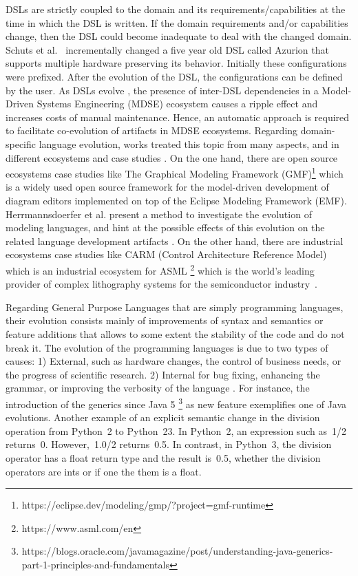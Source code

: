   
  DSLs are strictly coupled to the domain and
  its requirements/capabilities at the time in which the DSL is written. If the domain requirements and/or capabilities change, then the DSL could become inadequate to deal with the changed domain. Schuts et al.~\cite{schuts2021industrial} incrementally changed a five year old DSL called Azurion that supports multiple hardware preserving its behavior. Initially these configurations were prefixed. After the evolution of the DSL, the configurations can be defined by the user. 
 As DSLs evolve \cite{favre2005languages,herrmannsdorfer2013coupled}, the presence of inter-DSL dependencies in a Model-Driven Systems Engineering (MDSE) ecosystem causes a ripple effect and increases costs of manual maintenance. Hence, an automatic approach is required to facilitate co-evolution of artifacts in MDSE ecosystems.
   Regarding domain-specific language evolution, works treated this topic from many aspects, and in different ecosystems and case studies \cite{mengerink2016dsl}.
 On the one hand, there are open source ecosystems case studies like The Graphical Modeling Framework (GMF)\footnote{https://eclipse.dev/modeling/gmp/?project=gmf-runtime} which is a widely used open source framework for the model-driven development of diagram editors implemented on top of the Eclipse Modeling Framework (EMF). Herrmannsdoerfer et al. present a method to investigate the evolution of modeling languages, and hint at the possible effects of this evolution on the related language development artifacts  \cite{10.1007/978-3-642-12107-4_3}. On the other hand, there are industrial ecosystems case studies like CARM (Control Architecture Reference Model) which is an industrial ecosystem for ASML \footnote{https://www.asml.com/en} which is the world’s leading provider of complex lithography systems for the semiconductor industry~\cite{mengerink2016dsl}.

Regarding General Purpose Languages that are simply programming languages, their evolution consists mainly of improvements of syntax and semantics or feature additions that allows to some extent the stability of the code and do not break it.
 The evolution of the programming languages is due to two types of causes: 1) External, such as hardware changes, the control of business needs, or the progress of scientific research. 2) Internal for bug fixing, enhancing the grammar, or improving the verbosity of the language \cite{urma2017programming}.
 For instance, the introduction of the generics since Java 5 \footnote{https://blogs.oracle.com/javamagazine/post/understanding-java-generics-part-1-principles-and-fundamentals} as new feature exemplifies one of Java evolutions. Another example of an explicit semantic change in the division operation from Python~2 to Python~23. In Python~2, an expression such as~1/2 returns~0. However,~1.0/2 returns~0.5. In contrast, in Python~3, the division operator has a float return type and the result is~0.5, whether the division operators are ints or if one the them is a float.
 

